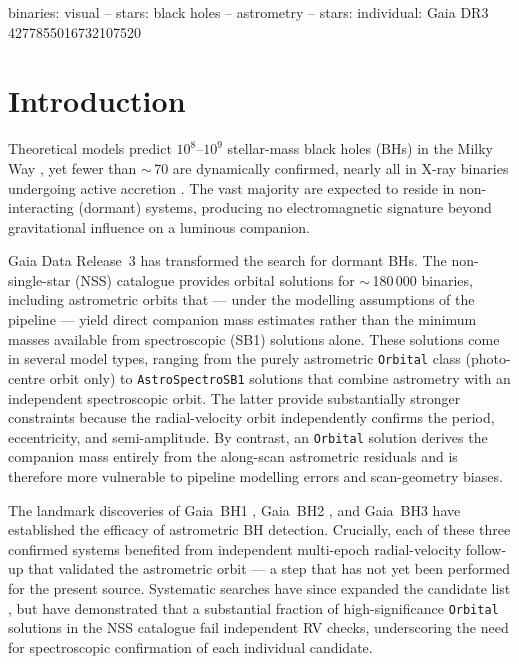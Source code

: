\documentclass[usenatbib,fleqn]{mnras}
\newcommand{\Msun}{{\rm M}_\odot}
\begin{document}
\begin{keywords}
binaries: visual -- stars: black holes -- astrometry --
stars: individual: Gaia DR3 4277855016732107520
\end{keywords}

\section{Introduction}
\label{sec:intro}

Theoretical models predict $10^8$--$10^9$ stellar-mass black holes
(BHs) in the Milky Way \citep{AgolKamionkowski2002, Shapiro1983},
yet fewer than $\sim$\,70 are dynamically confirmed, nearly all in
X-ray binaries undergoing active accretion
\citep{RemillardMcClintock2006}.  The vast majority are expected to
reside in non-interacting (dormant) systems, producing no
electromagnetic signature beyond gravitational influence on a
luminous companion.

Gaia Data Release~3 \citep[DR3;][]{GaiaCollaboration2023} has
transformed the search for dormant BHs.  The non-single-star (NSS)
catalogue \citep{GaiaNSS2023} provides orbital solutions for
$\sim$\,180\,000 binaries, including astrometric orbits that ---
under the modelling assumptions of the pipeline --- yield direct
companion mass estimates rather than the minimum masses
available from spectroscopic (SB1) solutions alone.  These solutions
come in several model types, ranging from the purely astrometric
\texttt{Orbital} class (photo-centre orbit only) to
\texttt{AstroSpectroSB1} solutions that combine astrometry with an
independent spectroscopic orbit.  The latter provide substantially
stronger constraints because the radial-velocity orbit independently
confirms the period, eccentricity, and semi-amplitude.  By contrast,
an \texttt{Orbital} solution derives the companion mass entirely from
the along-scan astrometric residuals and is therefore more vulnerable
to pipeline modelling errors and scan-geometry biases.

The landmark discoveries of Gaia~BH1
\citep[$M_2 \approx 9.6\,\Msun$;][]{ElBadry2023a}, Gaia~BH2
\citep[$M_2 \approx 8.9\,\Msun$;][]{ElBadry2023b}, and Gaia~BH3
\citep[$M_2 \approx 33\,\Msun$;][]{GaiaBH3_2024} have established
the efficacy of astrometric BH detection.  Crucially, each of these
three confirmed systems benefited from independent multi-epoch
radial-velocity follow-up that validated the astrometric orbit ---
a step that has not yet been performed for the present source.
Systematic searches have since expanded the candidate list
\citep{Jayasinghe2021, Thompson2019, Shenar2022, Mahy2022}, but
\citet{ElBadry2024} have demonstrated that a substantial fraction
of high-significance \texttt{Orbital} solutions in the NSS catalogue
fail independent RV checks, underscoring the need for spectroscopic
confirmation of each individual candidate.
\end{document}
